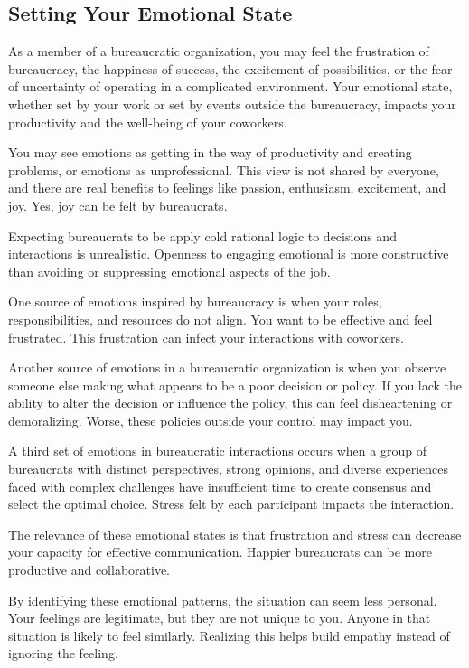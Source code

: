 \subsection{Setting Your Emotional State}

As a member of a bureaucratic organization, you may feel the frustration of bureaucracy, the happiness of success, the excitement of possibilities, or the fear of uncertainty of operating in a complicated environment. Your emotional state, whether set by your work or set by events outside the bureaucracy, impacts your productivity and the well-being of your coworkers. 

You may see emotions as getting in the way of productivity and creating problems, or emotions as unprofessional. This view is not shared by everyone, and there are real benefits to feelings like passion, enthusiasm, excitement, and joy. Yes, joy can be felt by bureaucrats. 

Expecting bureaucrats to be apply cold rational logic to decisions and interactions is unrealistic. Openness to engaging emotional is more constructive than avoiding or suppressing emotional aspects of the job. 

One source of emotions inspired by bureaucracy is when your roles, responsibilities, and resources do not align. You want to be effective and feel frustrated. This frustration can infect your interactions with coworkers. 

Another source of emotions in a bureaucratic organization is when you observe someone else making what appears to be a poor decision or policy. If you lack the ability to alter the decision or influence the policy, this can feel disheartening or demoralizing. Worse, these policies outside your control may impact you. 

A third set of emotions in bureaucratic interactions occurs when a group of bureaucrats with distinct perspectives, strong opinions, and diverse experiences faced with complex challenges have insufficient time to create consensus and select the optimal choice. Stress felt by each participant impacts the interaction. 

The relevance of these emotional states is that frustration and stress can decrease your capacity for effective communication. Happier bureaucrats can be more productive and collaborative. 

By identifying these emotional patterns, the situation can seem less personal. Your feelings are legitimate, but they are not unique to you. Anyone in that situation is likely to feel similarly. Realizing this helps build empathy instead of ignoring the feeling. 